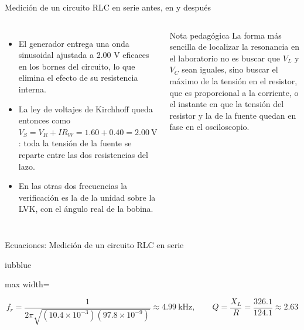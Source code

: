 \documentclass[aspectratio=169,11pt,xcolor={table}]{beamer}
\begin{document}
\begin{frame}{{\normalsize Medición de un circuito RLC en serie antes, en y después}}
\begin{columns}[c,onlytextwidth]
\small
\begin{itemize}\setlength{\itemsep}{4pt}
  \item El generador entrega una onda sinusoidal ajustada a 2.00 V eficaces en los bornes del circuito, lo que elimina el efecto de su resistencia interna.
  \item La ley de voltajes de Kirchhoff queda entonces como $V_S = V_R + I R_W = 1.60 + 0.40 = 2.00\ \text{V}$: toda la tensión de la fuente se reparte entre las dos resistencias del lazo.
  \item En las otras dos frecuencias la verificación es la de la unidad sobre la LVK, con el ángulo real de la bobina.
\end{itemize}
\begin{cardO}{Nota pedagógica}
\footnotesize La forma más sencilla de localizar la resonancia en el laboratorio no es buscar que $V_L$ y $V_C$ sean iguales, sino buscar el máximo de la tensión en el resistor, que es proporcional a la corriente, o el instante en que la tensión del resistor y la de la fuente quedan en fase en el osciloscopio.
\end{cardO}
\end{columns}
\end{frame}

\begin{frame}{Ecuaciones: Medición de un circuito RLC en serie}
\begin{cajaplana}{iubblue}
\centering
\begin{adjustbox}{max width=\linewidth}
\begin{minipage}{1.80\linewidth}
{\large
\begin{equation*}
  f_r = \frac{1}{2\pi\sqrt{(10.4 \times 10^{-3})(97.8 \times 10^{-9})}} \approx 4.99\ \text{kHz}, \qquad Q = \frac{X_L}{R} = \frac{326.1}{124.1} \approx 2.63
\end{equation*}
}
\end{minipage}
\end{adjustbox}
\end{cajaplana}
\end{frame}
\end{document}
